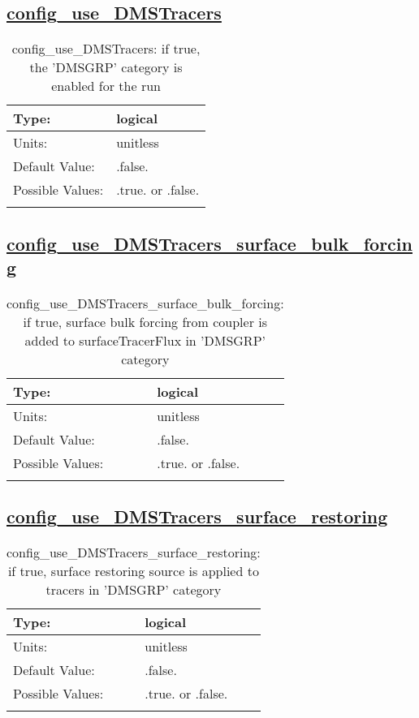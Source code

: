 \subsection[config\_use\_DMSTracers]{\hyperref[sec:nm_tab_tracer_forcing_DMSTracers]{config\_use\_DMSTracers}}
\label{subsec:nm_sec_config_use_DMSTracers}
\begin{center}
\begin{longtable}{| p{2.0in} || p{4.0in} |}
    \hline
    Type: & logical \\
    \hline
    Units: & \si{unitless} \\
    \hline
    Default Value: & .false. \\
    \hline
    Possible Values: & .true. or .false. \\
    \hline
    \caption{config\_use\_DMSTracers: if true, the 'DMSGRP' category is enabled for the run}
\end{longtable}
\end{center}
\subsection[config\_use\_DMSTracers\_surface\_bulk\_forcing]{\hyperref[sec:nm_tab_tracer_forcing_DMSTracers]{config\_use\_DMSTracers\_surface\_bulk\_forcing}}
\label{subsec:nm_sec_config_use_DMSTracers_surface_bulk_forcing}
\begin{center}
\begin{longtable}{| p{2.0in} || p{4.0in} |}
    \hline
    Type: & logical \\
    \hline
    Units: & \si{unitless} \\
    \hline
    Default Value: & .false. \\
    \hline
    Possible Values: & .true. or .false. \\
    \hline
    \caption{config\_use\_DMSTracers\_surface\_bulk\_forcing: if true, surface bulk forcing from coupler is added to surfaceTracerFlux in 'DMSGRP' category}
\end{longtable}
\end{center}
\subsection[config\_use\_DMSTracers\_surface\_restoring]{\hyperref[sec:nm_tab_tracer_forcing_DMSTracers]{config\_use\_DMSTracers\_surface\_restoring}}
\label{subsec:nm_sec_config_use_DMSTracers_surface_restoring}
\begin{center}
\begin{longtable}{| p{2.0in} || p{4.0in} |}
    \hline
    Type: & logical \\
    \hline
    Units: & \si{unitless} \\
    \hline
    Default Value: & .false. \\
    \hline
    Possible Values: & .true. or .false. \\
    \hline
    \caption{config\_use\_DMSTracers\_surface\_restoring: if true, surface restoring source is applied to tracers in 'DMSGRP' category}
\end{longtable}
\end{center}
